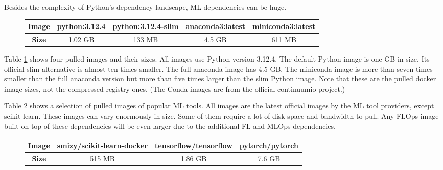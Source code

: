 Besides the complexity of Python's dependency landscape, ML dependencies can be huge.
\begin{figure}[t]
    \begin{changemargin}{0cm}{0cm}
        \centering
        \begin{tabular}{|c||c|c|c|c|}
            \hline
                \textbf{Image} & python:3.12.4 & python:3.12.4-slim & anaconda3:latest & miniconda3:latest \\
            \hline
                \textbf{Size} & 1.02 GB & 133 MB & 4.5 GB & 611 MB
            \\
            \hline
        \end{tabular}
        \label{table:conda_python_comparison}
    \end{changemargin}
\end{figure}

Table \ref{table:conda_python_comparison} shows four pulled images and their sizes.
All images use Python version 3.12.4.
The default Python image is one GB in size.
Its official slim alternative is almost ten times smaller.
The full anaconda image has 4.5 GB.
The miniconda image is more than seven times smaller than the full anaconda version but more than five times larger than the slim Python image.
Note that these are the pulled docker image sizes, not the compressed registry ones.
(The Conda images are from the official continuumio project.)

Table \ref{table:ml_libs_images_compared} shows a selection of pulled images of popular ML tools.
All images are the latest official images by the ML tool providers, except scikit-learn.
These images can vary enormously in size.
Some of them require a lot of disk space and bandwidth to pull.
Any FLOps image built on top of these dependencies will be even larger due to the additional FL and MLOps dependencies.

\begin{figure}[t]
    \begin{changemargin}{0cm}{0cm}
        \centering
        \begin{tabular}{|c||c|c|c|}
            \hline
                \textbf{Image} & smizy/scikit-learn-docker & tensorflow/tensorflow & pytorch/pytorch \\
            \hline
                \textbf{Size} & 515 MB & 1.86 GB & 7.6 GB
            \\
            \hline
        \end{tabular}
        \label{table:ml_libs_images_compared}
    \end{changemargin}
    \end{figure}